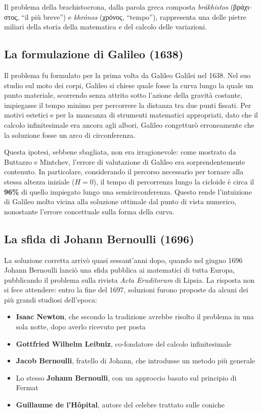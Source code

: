 \documentclass[a4paper,12pt]{article} %
\begin{document}
Il problema della brachistocrona, dalla parola greca composta \textit{brákhistos} (\foreignlanguage{greek}
{βράχιστος}, ``il più breve'') e \textit{khrónos} (\foreignlanguage{greek}{χρόνος}, ``tempo''), rappresenta
una delle pietre miliari della storia della matematica e del calcolo delle variazioni.

\subsection{La formulazione di Galileo (1638)}

Il problema fu formulato per la prima volta da Galileo Galilei nel 1638. Nel suo studio sul moto dei corpi,
Galileo si chiese quale fosse la curva lungo la quale un punto materiale, scorrendo senza attrito sotto
l'azione della gravità costante, impiegasse il tempo minimo per percorrere la distanza tra due punti fissati.
Per motivi estetici e per la mancanza di strumenti matematici appropriati, dato che il calcolo infinitesimale
era ancora agli albori, Galileo congetturò erroneamente che la soluzione fosse un arco di circonferenza.

Questa ipotesi, sebbene sbagliata, non era irragionevole: come mostrato da Buttazzo e Mintchev, l'errore di
valutazione di Galileo era sorprendentemente contenuto. In particolare, considerando il percorso necessario
per tornare alla stessa altezza iniziale ($H=0$), il tempo di percorrenza lungo la cicloide è circa il
\textbf{96\%} di quello impiegato lungo una semicirconferenza. Questo rende l'intuizione di Galileo molto
vicina alla soluzione ottimale dal punto di vista numerico, nonostante l'errore concettuale sulla forma
della curva.

\subsection{La sfida di Johann Bernoulli (1696)}

La soluzione corretta arrivò quasi sessant'anni dopo, quando nel giugno 1696 Johann Bernoulli lanciò una sfida
pubblica ai matematici di tutta Europa, pubblicando il problema sulla rivista \textit{Acta Eruditorum} di Lipsia.
La risposta non si fece attendere: entro la fine del 1697, soluzioni furono proposte da alcuni dei più grandi
studiosi dell'epoca:

\begin{itemize}
    \item \textbf{Isaac Newton}, che secondo la tradizione avrebbe risolto il problema in una sola notte,
          dopo averlo ricevuto per posta
    \item \textbf{Gottfried Wilhelm Leibniz}, co-fondatore del calcolo infinitesimale
    \item \textbf{Jacob Bernoulli}, fratello di Johann, che introdusse un metodo più generale
    \item Lo stesso \textbf{Johann Bernoulli}, con un approccio basato sul principio di Fermat
    \item \textbf{Guillaume de l'Hôpital}, autore del celebre trattato sulle coniche
\end{itemize}
\end{document}
